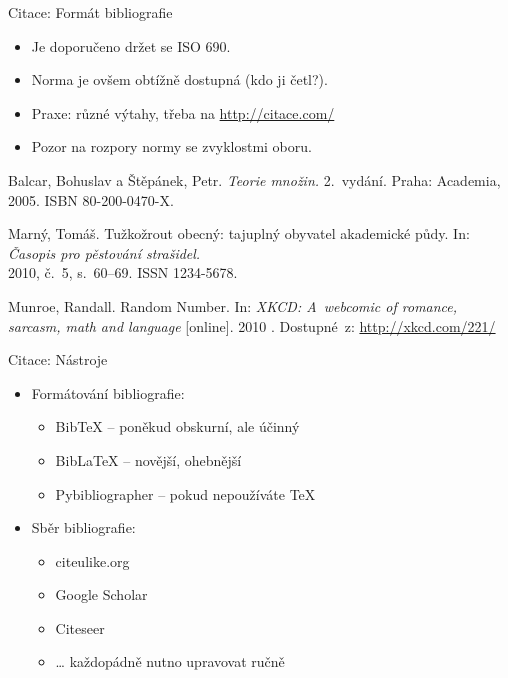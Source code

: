 \documentclass{beamer}
\begin{document}
\begin{frame}{Citace: Formát bibliografie}

\begin{itemize}
\item Je doporučeno držet se ISO 690.
\item Norma je ovšem obtížně dostupná (kdo ji četl?).
\item Praxe: různé výtahy, třeba na \url{http://citace.com/}
\item Pozor na rozpory normy se zvyklostmi oboru.
\end{itemize}

\vfill

{\sc Balcar}, Bohuslav a {\sc Štěpánek}, Petr. {\it Teorie množin.\/}
2.~vydání. Praha: Academia, 2005. ISBN 80-200-0470-X.

\medskip

{\sc Marný}, Tomáš. Tužkožrout obecný: tajuplný obyvatel akademické půdy.
In: {\it Časopis pro pěstování strašidel.} \\
2010, č.~5, s.~60--69. ISSN 1234-5678.

\medskip

{\sc Munroe,} Randall. Random Number.
In: {\it XKCD: A~webcomic of romance, sarcasm, math and language\/} [online].
2010 \hfil\break
[cit. 2011-10-04]. Dostupné~z: \url{http://xkcd.com/221/}
\end{frame}

\begin{frame}{Citace: Nástroje}

\begin{itemize}
\item Formátování bibliografie:
   \begin{itemize}
   \item Bib\TeX{} -- poněkud obskurní, ale účinný
   \item Bib\LaTeX{} -- novější, ohebnější
   \item Pybibliographer -- pokud nepoužíváte \TeX
   \end{itemize}
\bigskip
\item Sběr bibliografie:
   \begin{itemize}
   \item citeulike.org
   \item Google Scholar
   \item Citeseer
   \item \dots{} každopádně nutno upravovat ručně
   \end{itemize}
\end{itemize}

\end{frame}
\end{document}

